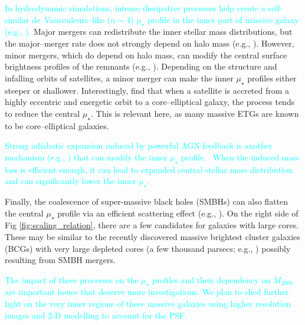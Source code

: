 \documentclass[a4paper,fleqn,usenatbib]{mnras}
\def\mhalo{{$M_{\mathrm{200b}}$}}
\def\mden{{$\mu_{\star}$}}
\newcommand{\song}[1]{\textcolor{cyan}{#1}}
\begin{document}
    \song{
    In hydrodynamic simulations, intense dissipative processes help create a 
    self-similar de~Vaucouleurs--like ($n{\sim} 4$) \mden{} profile in the inner
    part of massive galaxy (e.g., \citealt{Hopkins2008}).
    } 
    Major mergers can redistribute the inner stellar mass distributions, but 
    the major--merger rate does not strongly depend on halo mass 
    (e.g., \citealt{Shankar2014}). 
    However, minor mergers, which do depend on halo mass, can modify the central 
    surface brightness profiles of the remnants (e.g., \citealt{BoylanKolchin2007}). 
    Depending on the structure and infalling orbits of satellites, a minor merger 
    can make the inner \mden{} profiles either steeper or shallower.  
    Interestingly, \citet{BoylanKolchin2007} find that when a satellite is accreted 
    from a highly eccentric and energetic orbit to a core--elliptical galaxy, the 
    process tends to reduce the central \mden{}.  
    This is relevant here, as many massive ETGs are known to be core--elliptical 
    galaxies. 
    
    \song{
    Strong adiabatic expansion induced by powerful AGN feedback is another mechanism 
    (e.g., \citealt{Fan2008}) that can modify the inner \mden{} profile. \
    When the induced mass loss is efficient enough, it can lead to expanded 
    central stellar mass distribution and can significantly lower the inner \mden{}. 
    } 
    
    Finally, the coalescence of super-massive black holes (SMBHs) can also flatten 
    the central \mden{} profile via an efficient scattering effect 
    (e.g., \citealt{Milosavljevi2002}).
    On the right side of Fig \ref{fig:scaling_relation}, there are a few candidates 
    for galaxies with large cores. 
    These may be similar to the recently discovered massive brightest cluster galaxies 
    (BCGs) with very large depleted cores (a few thousand parsecs; e.g., 
    \citealt{Postman2012, LopezCruz2014, Thomas2016, Bonfini2016}) possibly resulting 
    from SMBH mergers.
    
    \song{
    The impact of these processes on the \mden{} profiles and their dependency on 
    \mhalo{} are important issues that deserve more investigations. 
    We plan to shed further light on the very inner regions of these massive galaxies 
    using higher resolution images and 2-D modelling to account for the PSF.
    }

\end{document}
